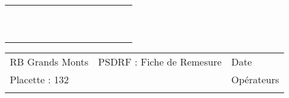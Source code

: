 \documentclass[a4paper, landscape]{article}\usepackage[]{graphicx}\usepackage[]{color}
\begin{document}
{\begin{tabular}{|p{1cm}|p{2cm}|p{1.6cm}|p{1.6cm}|p{1.6cm}|p{1.6cm}|p{1.5cm}|p{1.5cm}|p{1.5cm}|p{1.5cm}|p{1.5cm}|p{7.5cm}|p{5cm}|}
   \rowcolor[gray]{0.95} \hline
 &  &  &  &  &  &  &  &  &  &  &  &  \\ 
   \hline
 &  &  &  &  &  &  &  &  &  &  &  &  \\ 
   \rowcolor[gray]{0.95} \hline
 &  &  &  &  &  &  &  &  &  &  &  &  \\ 
   \hline
 &  &  &  &  &  &  &  &  &  &  &  &  \\ 
   \rowcolor[gray]{0.95} \hline
 &  &  &  &  &  &  &  &  &  &  &  &  \\ 
   \hline
 &  &  &  &  &  &  &  &  &  &  &  &  \\ 
   \rowcolor[gray]{0.95} \hline
 &  &  &  &  &  &  &  &  &  &  &  &  \\ 
   \hline
 &  &  &  &  &  &  &  &  &  &  &  &  \\ 
   \rowcolor[gray]{0.95} \hline
 &  &  &  &  &  &  &  &  &  &  &  &  \\ 
   \hline
 &  &  &  &  &  &  &  &  &  &  &  &  \\ 
   \rowcolor[gray]{0.95} \hline
 &  &  &  &  &  &  &  &  &  &  &  &  \\ 
   \hline
\end{tabular}
}

\begin{tabular}{p{10cm}p{10cm}p{8cm}}
  RB Grands Monts & PSDRF : Fiche de Remesure & Date \\ 
  Placette : 132 &  & Opérateurs \\ 
   &  &  \\ 
  \end{tabular}
\end{document}

